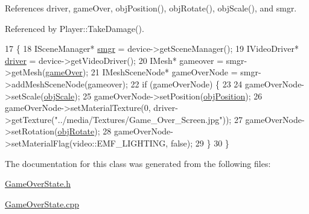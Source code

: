 References driver, game\-Over, obj\-Position(), obj\-Rotate(), obj\-Scale(), and smgr.



Referenced by Player\-::\-Take\-Damage().


\begin{DoxyCode}
17 \{
18     ISceneManager* \hyperlink{_game_8cpp_a80a0cf5a63a07fec786bf483e5f22c39}{smgr} = device->getSceneManager();
19     IVideoDriver* \hyperlink{_game_8cpp_ae8ebff0dce398b6764c0e99ec847754a}{driver} = device->getVideoDriver();
20     IMesh* gameover = smgr->getMesh(\hyperlink{_game_over_state_8cpp_aabad4636da8523fe67bd2fd70fed4021}{gameOver});
21     IMeshSceneNode* gameOverNode = smgr->addMeshSceneNode(gameover);
22     \textcolor{keywordflow}{if} (gameOverNode) \{
23 
24         gameOverNode->setScale(\hyperlink{_game_over_state_8cpp_abdb0d8cc9203bffba5b918ea503b74b3}{objScale});
25         gameOverNode->setPosition(\hyperlink{_game_over_state_8cpp_a95ace4ba7bfe975cffbaee29643c4582}{objPosition});
26         gameOverNode->setMaterialTexture(0, driver->getTexture(\textcolor{stringliteral}{"../media/Textures/Game\_Over\_Screen.jpg"}));
27         gameOverNode->setRotation(\hyperlink{_game_over_state_8cpp_a15211b85543f06a861f27593015a3c38}{objRotate});
28         gameOverNode->setMaterialFlag(video::EMF\_LIGHTING, \textcolor{keyword}{false});
29     \}
30 \}
\end{DoxyCode}


The documentation for this class was generated from the following files\-:\begin{DoxyCompactItemize}
\item 
\hyperlink{_game_over_state_8h}{Game\-Over\-State.\-h}\item 
\hyperlink{_game_over_state_8cpp}{Game\-Over\-State.\-cpp}\end{DoxyCompactItemize}
